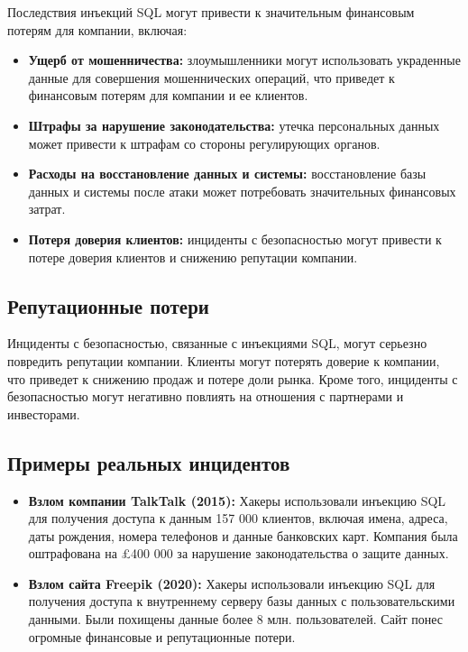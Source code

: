 \documentclass[a4paper,12pt]{diplom}
\begin{document}
	 Последствия инъекций SQL могут привести к значительным финансовым потерям для компании, включая:
	 
	 \begin{itemize}
	 	\item \textbf{Ущерб от мошенничества:} злоумышленники могут использовать украденные данные для совершения мошеннических операций, что приведет к финансовым потерям для компании и ее клиентов. 
	 	\item \textbf{Штрафы за нарушение законодательства:} утечка персональных данных может привести к штрафам со стороны регулирующих органов. 
	 	\item \textbf{Расходы на восстановление данных и системы:} восстановление базы данных и системы после атаки может потребовать значительных финансовых затрат. 
	 	\item \textbf{Потеря доверия клиентов:} инциденты с безопасностью могут привести к потере доверия клиентов и снижению репутации компании. 
	 \end{itemize}
	 
	 \subsection{Репутационные потери}
	 
	 Инциденты с безопасностью, связанные с инъекциями SQL, могут серьезно повредить репутации компании.  Клиенты могут потерять доверие к компании, что приведет к снижению продаж и потере доли рынка.  Кроме того, инциденты с безопасностью могут негативно повлиять на отношения с партнерами и инвесторами. 
	 
	 \subsection{Примеры реальных инцидентов}
	 
	 \begin{itemize}
	 	\item \textbf{Взлом компании TalkTalk (2015):} Хакеры использовали инъекцию SQL для получения доступа к данным 157 000 клиентов, включая имена, адреса, даты рождения, номера телефонов и данные банковских карт. Компания была оштрафована на £400 000 за нарушение законодательства о защите данных.\cite{2015_TalkTalk_data_breach}
	 	\item \textbf{Взлом сайта Freepik (2020): } Хакеры использовали инъекцию SQL для получения доступа к внутреннему серверу базы данных с пользовательскими данными. Были похищены данные более 8 млн. пользователей. Сайт понес огромные финансовые и репутационные потери. \cite{2020_freepik_data_breach}
	 \end{itemize}
	 
\end{document}
